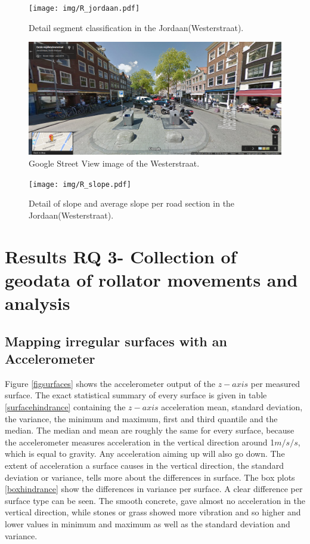 
\begin{figure}[ht]
\texttt{[image: img/R\_jordaan.pdf]}
\centering
\caption{Detail segment classification in the Jordaan(Westerstraat).\label{jordaanroad}}
\end{figure} 

\begin{figure}[hb]
\includegraphics[width=\textwidth]{img/R_Westerstraat.png}
\centering
\caption{Google Street View image of the Westerstraat.\label{westerstraat}}
\end{figure} 

\clearpage
\begin{figure}[h]
\texttt{[image: img/R\_slope.pdf]}
\centering
\caption{Detail of slope and average slope per road section in the Jordaan(Westerstraat).\label{jordaanroadslope}}
\end{figure} 
\clearpage
\section{Results RQ 3- Collection of geodata of rollator movements and analysis}\label{Rrq2b}
\subsection{Mapping irregular surfaces with an Accelerometer}
Figure \ref{figsurfaces} shows the accelerometer output of the $z-axis$ per measured surface. The exact statistical summary of every surface is given in table \ref{surfacehindrance} containing the $z-axis$ acceleration mean, standard deviation, the variance, the minimum and maximum, first and third quantile and the median. The median and mean are roughly the same for every surface, because the accelerometer measures acceleration in the vertical direction around 1$m/s/s$, which is equal to gravity. Any acceleration aiming up will also go down. The extent of acceleration a surface causes in the vertical direction, the standard deviation or variance, tells more about the differences in surface.
The box plots \ref{boxhindrance} show the differences in variance per surface. A clear difference per surface type can be seen. The smooth concrete, gave almost no acceleration in the vertical direction, while stones or grass showed more vibration and so higher and lower values in minimum and maximum as well as the standard deviation and variance. 

